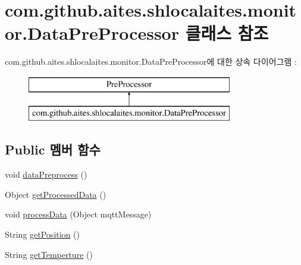 \hypertarget{classcom_1_1github_1_1aites_1_1shlocalaites_1_1monitor_1_1_data_pre_processor}{}\section{com.\+github.\+aites.\+shlocalaites.\+monitor.\+Data\+Pre\+Processor 클래스 참조}
\label{classcom_1_1github_1_1aites_1_1shlocalaites_1_1monitor_1_1_data_pre_processor}
com.\+github.\+aites.\+shlocalaites.\+monitor.\+Data\+Pre\+Processor에 대한 상속 다이어그램 \+: \begin{figure}[H]
\begin{center}
\leavevmode
\includegraphics[height=2.000000cm]{classcom_1_1github_1_1aites_1_1shlocalaites_1_1monitor_1_1_data_pre_processor}
\end{center}
\end{figure}
\subsection*{Public 멤버 함수}
\begin{DoxyCompactItemize}
\item 
void \mbox{\hyperlink{classcom_1_1github_1_1aites_1_1shlocalaites_1_1monitor_1_1_data_pre_processor_abff58cf7b97f2f77f6bf45d9c8d4b83b}{data\+Preprocess}} ()
\item 
Object \mbox{\hyperlink{classcom_1_1github_1_1aites_1_1shlocalaites_1_1monitor_1_1_data_pre_processor_ac165b9f67006ca13b2228264d3cb32bb}{get\+Processed\+Data}} ()
\item 
void \mbox{\hyperlink{classcom_1_1github_1_1aites_1_1shlocalaites_1_1monitor_1_1_data_pre_processor_a6eef68822e1d6a647dc174495d19e437}{process\+Data}} (Object mqtt\+Message)
\item 
String \mbox{\hyperlink{classcom_1_1github_1_1aites_1_1shlocalaites_1_1monitor_1_1_data_pre_processor_a6074a5ad7726a7249ed576dd1ec06b01}{get\+Position}} ()
\item 
String \mbox{\hyperlink{classcom_1_1github_1_1aites_1_1shlocalaites_1_1monitor_1_1_data_pre_processor_a151e8bf6087f2b8d1882fd06bfeb9398}{get\+Temperture}} ()
\end{DoxyCompactItemize}
